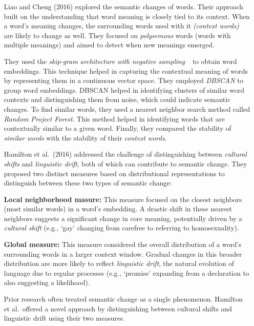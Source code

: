 Liao and Cheng (2016) explored the semantic changes of words.
Their approach built on the understanding that word meaning is closely tied to its context.
When a word's meaning changes, the surrounding words used with it \emph{(context words)} are likely to change as well.
They focused on \emph{polysemous} words (words with multiple meanings) and aimed to detect when new meanings emerged.

They used the \emph{skip-gram architecture with negative sampling} ~\cite{10.5555/2999792.2999959} to obtain word embeddings.
This technique helped in capturing the contextual meaning of words by representing them in a continuous vector space.
They employed \emph{DBSCAN} to group word embeddings.
DBSCAN helped in identifying clusters of similar word contexts and distinguishing them from noise, which could indicate semantic changes.
To find similar words, they used a nearest neighbor search method called \emph{Random Project Forest}.
This method helped in identifying words that are contextually similar to a given word.
 Finally, they compared the stability of \emph{similar words} with the stability of their \emph{context words}.

Hamilton et al.\ (2016) addressed the challenge of distinguishing between \emph{cultural shifts} and \emph{linguistic drift}, both of which can contribute to semantic change.
They proposed two distinct measures based on distributional representations to distinguish between these two types of semantic change:
\begin{packed_enumerate}
    \item \textbf{Local neighborhood masure:}
    This measure focused on the closest neighbors (most similar words) in a word's embedding.
    A drastic shift in these nearest neighbors suggests a significant change in core meaning, potentially driven by a \emph{cultural shift}
    (e.g., `gay' changing from carefree to referring to homosexuality).
    \item \textbf{Global measure:}
    This measure considered the overall distribution of a word's surrounding words in a larger context window.
    Gradual changes in this broader distribution are more likely to reflect \emph{linguistic drift}, the natural evolution of language due to regular processes
    (e.g., `promise' expanding from a declaration to also suggesting a likelihood).
\end{packed_enumerate}
Prior research often treated semantic change as a single phenomenon.
Hamilton et al.\ offered a novel approach by distinguishing between cultural shifts and linguistic drift using their two measures.

